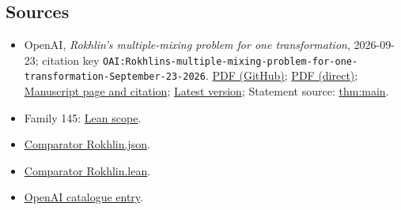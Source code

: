 \documentclass[11pt]{article}
\begin{document}
\subsection{Sources}
\begin{itemize}
\item OpenAI, \emph{Rokhlin's multiple-mixing problem for one transformation}, 2026-09-23; citation key \texttt{OAI:Rokhlins-multiple-mixing-problem-for-one-transformation-September-23-2026}. \href{https://github.com/openai/math/blob/adc7f1241b42e322a6451854ab7e4b4c146bf78a/preprints/Rokhlins-multiple-mixing-problem-for-one-transformation-September-23-2026/paper.pdf}{PDF (GitHub)}; \href{https://github.com/openai/math/raw/adc7f1241b42e322a6451854ab7e4b4c146bf78a/preprints/Rokhlins-multiple-mixing-problem-for-one-transformation-September-23-2026/paper.pdf}{PDF (direct)}; \href{https://github.com/openai/math/blob/adc7f1241b42e322a6451854ab7e4b4c146bf78a/preprints/Rokhlins-multiple-mixing-problem-for-one-transformation-September-23-2026/README.md}{Manuscript page and citation}; \href{https://github.com/openai/math/blob/main/preprints/Rokhlins-multiple-mixing-problem-for-one-transformation-September-23-2026/paper.pdf}{Latest version}; Statement source: \href{https://github.com/openai/math/blob/adc7f1241b42e322a6451854ab7e4b4c146bf78a/preprints/Rokhlins-multiple-mixing-problem-for-one-transformation-September-23-2026/build/sections/01-introduction.tex\#L21}{thm:main}.
\item Family 145: \href{https://github.com/openai/math/blob/adc7f1241b42e322a6451854ab7e4b4c146bf78a/lean/docs/145.md}{Lean scope}.
\item \href{https://github.com/openai/math/blob/adc7f1241b42e322a6451854ab7e4b4c146bf78a/lean/ComparatorChallenges/Rokhlin.json}{Comparator Rokhlin.json}.
\item \href{https://github.com/openai/math/blob/adc7f1241b42e322a6451854ab7e4b4c146bf78a/lean/ComparatorChallenges/Rokhlin.lean}{Comparator Rokhlin.lean}.
\item \href{https://github.com/openai/math/blob/adc7f1241b42e322a6451854ab7e4b4c146bf78a/CONTENTS.md}{OpenAI catalogue entry}.
\end{itemize}
\end{document}
